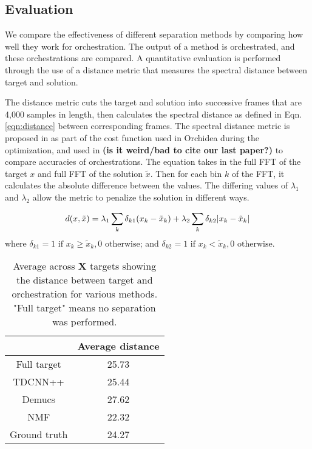 \documentclass{article}
\begin{document}
		\subsection{Evaluation}
		We compare the effectiveness of different separation methods by comparing how well they work for orchestration. The output of a method is orchestrated, and these orchestrations are compared. A quantitative evaluation is performed through the use of a distance metric that measures the spectral distance between target and solution. 
		
		The distance metric cuts the target and solution into successive frames that are 4,000 samples in length, then calculates the spectral distance as defined in Eqn. \ref{eqn:distance} between corresponding frames. The spectral distance metric is proposed in \cite{Cella2020} as part of the cost function used in Orchidea during the optimization, and used in \cite{Cella2020b} \textbf{(is it weird/bad to cite our last paper?)} to compare accuracies of orchestrations. The equation takes in the full FFT of the target $x$ and full FFT of the solution $\tilde{x}$. Then for each bin $k$ of the FFT, it calculates the absolute difference between the values. The differing values of $\lambda_1$ and $\lambda_2$ allow the metric to penalize the solution in different ways.
		
		\begin{equation}\label{eqn:distance}
d(x, \tilde{x}) =\lambda_1 \sum_k \delta_{k1}(x_k - \tilde{x}_k) + \lambda_2 \sum_k \delta_{k2}|x_k - \tilde{x	}_k| \\
\end{equation}
where $\delta_{k1} = 1 \text{  if  } x_k \ge \tilde{x}_k, 0 \text{  otherwise}$; and $\delta_{k2} = 1 \text{  if  } x_k < \tilde{x}_k, 0 \text{  otherwise}$.
	
	
	\begin{table}[t]
		\begin{center}
			\begin{tabular}{|c|c|}
				\hline
				& Average distance \\
				\hline
				Full target & 25.73 \\
				\hline
				TDCNN++ & 25.44 \\
				\hline
				Demucs & 27.62 \\
				\hline
				NMF & 22.32 \\
				\hline
				Ground truth & 24.27 \\
				\hline
			\end{tabular}
		\end{center}
		\caption{Average across \textbf{X} targets showing the distance between target and orchestration for various methods. "Full target" means no separation was performed. }
		\label{tab:distances}
	\end{table}
	
\end{document}
